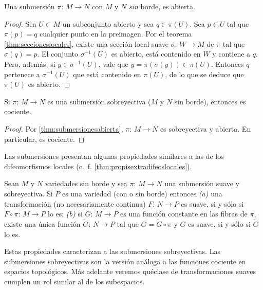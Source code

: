 \begin{propoSubmersionEsAbierta}\label{thm:submersionesabierta}
	Una submersi\'{o}n $\pi:\,M\rightarrow N$ con $M$ y $N$ \emph{sin}
	borde, es abierta.
\end{propoSubmersionEsAbierta}

\begin{proof}
	Sea $U\subset M$ un subconjunto abierto y sea $q\in \pi(U)$. Sea
	$p\in U$ tal que $\pi(p)=q$ cualquier punto en la preimagen. Por
	el teorema \ref{thm:seccioneslocales}, existe una secci\'{o}n
	local suave $\sigma:\,W\rightarrow M$ de $\pi$ tal que $\sigma(q)=p$.
	El conjunto $\sigma^{-1}(U)$ es abierto, est\'{a} contenido en $W$
	y contiene a $q$. Pero, adem\'{a}s, si $y\in\sigma^{-1}(U)$, vale
	que $y=\pi(\sigma(y))\in\pi(U)$. Entonces $q$ pertenece a
	$\sigma^{-1}(U)$ que est\'{a} contenido en $\pi(U)$, de lo que se
	deduce que $\pi(U)$ es abierto.
\end{proof}

\begin{coroSubmersionSobreEsCociente}\label{thm:submersionsobreescociente}
	Si $\pi:\,M\rightarrow N$ es una submersi\'{o}n sobreyectiva
	($M$ y $N$ sin borde), entonces es cociente.
\end{coroSubmersionSobreEsCociente}

\begin{proof}
	Por \ref{thm:submersionesabierta}, $\pi:\,M\rightarrow N$ es
	sobreyectiva y abierta. En particular, es cociente.
\end{proof}

Las submersiones presentan algunas propiedades similares a las de los
difeomorfismos locales (c.~f. \ref{thm:propisextradifeoslocales}).

\begin{propoSubmersionesExtra}\label{thm:propisextrasubmersiones}
	Sean $M$ y $N$ variedades sin borde y sea $\pi:\,M\rightarrow N$ una
	submersi\'{o}n suave y sobreyectiva. Si $P$ es una variedad
	(con o sin borde) entonces \emph{(a)} una transformaci\'{o}n
	(no necesariamente continua) $F:\,N\rightarrow P$ es suave, si y
	s\'{o}lo si $F\circ\pi:\,M\rightarrow P$ lo es; \emph{(b)} si
	$G:\,M\rightarrow P$ es una funci\'{o}n constante en las fibras de
	$\pi$, existe una \'{u}nica funci\'{o}n $\tilde{G}:\,N\rightarrow P$
	tal que $G=\tilde{G}\circ\pi$ y $G$ es suave, si y s\'{o}lo si
	$\tilde{G}$ lo es.
\end{propoSubmersionesExtra}

Estas propiedades caracterizan a las submersiones sobreyectivas. Las
submersiones sobreyectivas son la versi\'{o}n an\'{a}loga a las
funciones cociente en espacios topol\'{o}gicos. M\'{a}s adelante veremos
qu\'{e}clase de transformaciones suaves cumplen un rol similar al de
los subespacios.

